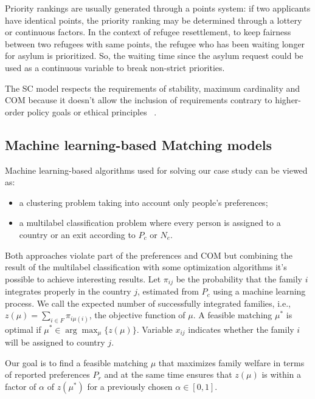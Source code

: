 Priority rankings are usually generated through a points system: if two applicants have identical points, the priority ranking may be determined through a lottery or continuous factors. In the context of refugee resettlement, to keep fairness between two refugees with same points, the refugee who has been waiting longer for asylum is prioritized. So, the waiting time since the asylum request could be used as a continuous variable to break non-strict priorities.

The SC model respects the requirements of stability, maximum cardinality and COM because it doesn't allow the inclusion of requirements contrary to higher-order policy goals or ethical principles ~\cite{basshuysen}.


\subsection{Machine learning-based Matching models}\label{machine-learning-based-matching}%

Machine learning-based algorithms used for solving our case study can be viewed as:

\begin{itemize}
    \item a clustering problem taking into account only people's preferences;
    \item a multilabel classification problem where every person is assigned to a country or an exit according to \(P_c\) or \(N_e\).
\end{itemize}
Both approaches violate part of the preferences and COM but combining the result of the multilabel classification with some optimization algorithms it's possible to achieve interesting results. Let \(\pi_{ij}\) be the probability that the family \(i\) integrates properly in the country \(j\), estimated from \(P_c\) using a machine learning process. We call the expected number of successfully integrated families, i.e., \(z (\mu) = \sum_{i \in F} \pi_{i \mu (i)}\), the objective function of \(\mu\). A feasible matching \(\mu^*\) is optimal if \(\mu^* \in \arg\max_{\mu} \{z (\mu)\}\). Variable \(x_{ij}\) indicates whether the family \(i\) will be assigned to country \(j\).

Our goal is to find a feasible matching \(\mu\) that maximizes family welfare in terms of reported preferences \(P_r\) and at the same time ensures that \(z (\mu)\) is within a factor of \(\alpha\) of \(z \left( \mu^* \right)\) for a previously chosen \(\alpha \in [0,1]\).

